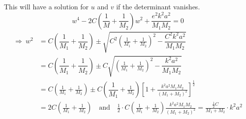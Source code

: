 This will have a solution for $u$ and $v$ if the determinant vanishes.
$$
w^{4}-2C\left(\frac{1}{M}+\frac{1}{M_{2}}\right)w^{2}+\dfrac{e^{2}k^{2}a^{2}}{M_{1}M_{2}}=0
$$
\begin{align*}
\Rightarrow \ w^{2} &= C\left(\dfrac{1}{M_{1}}+\dfrac{1}{M_{2}}\right)\pm \sqrt{C^{2}\left(\frac{1}{M_{1}}+\frac{1}{M_{2}}\right)^{2}-\dfrac{C^{2}k^{2}a^{2}}{M_{1}M_{2}}}\\
&= C\left(\dfrac{1}{M_{1}}+\dfrac{1}{M_{2}}\right)\pm C\sqrt{\left(\frac{1}{M_{1}}+\frac{1}{M_{2}}\right)^{2}-\dfrac{k^{2}a^{2}}{M_{1}M_{2}}}\\
&= C\left(\frac{1}{M_{1}}+\frac{1}{M_{2}}\right)\pm C\left(\dfrac{1}{M_{1}}+\frac{1}{M_{2}}\right)\left[1+\frac{k^{2}a^{2}M_{1}M_{2}}{(M_{1}+M_{2})^{2}}\right]^{\frac{1}{2}}\\
&= 2C\left(\frac{1}{M_{1}}+\frac{1}{M_{2}}\right)\quad\text{and}\quad \frac{1}{2}\cdot C\left(\frac{1}{M_{1}}+\frac{1}{M_{2}}\right)\frac{k^{2}a^{2}M_{1}M_{2}}{(M_{1}+M_{2})^{2}}=\frac{\frac{1}{2}C}{M_{1}+M_{2}}\cdot k^{2}a^{2}
\end{align*}
